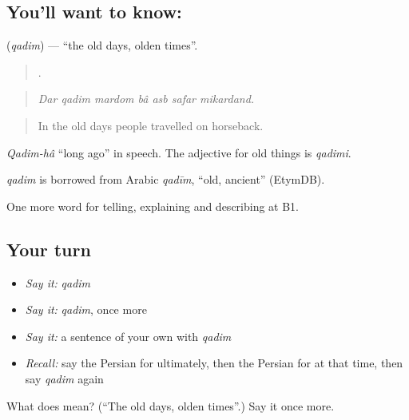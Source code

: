 \subsection*{You'll want to know: }
\textbf{} (\emph{qadim}) — \textquotedblleft{}the old days, olden times\textquotedblright{}.

\begin{quote}
      .
\end{quote}

\begin{quote}
\emph{Dar qadim mardom bâ asb safar mikardand.}
\end{quote}

\begin{quote}
In the old days people travelled on horseback.
\end{quote}

\emph{Qadim-hâ} \textquotedblleft{}long ago\textquotedblright{} in speech. The adjective for old things is \emph{qadimi}.

\begin{cousinweb}
\emph{qadim} is borrowed from Arabic \emph{qadīm}, \textquotedblleft{}old, ancient\textquotedblright{} (EtymDB).
\end{cousinweb}

\begin{grammarlens}[title={What you've built}]
One more word for telling, explaining and describing at B1.
\end{grammarlens}

\subsection*{Your turn}
\begin{itemize}
\raggedright
  \item \emph{Say it:} \emph{qadim}
  \item \emph{Say it:} \emph{qadim}, once more
  \item \emph{Say it:} a sentence of your own with \emph{qadim}
  \item \emph{Recall:} say the Persian for ultimately, then the Persian for at that time, then say \emph{qadim} again
\end{itemize}

\begin{tcolorbox}[breakable,colback=teal!4,colframe=teal!35!black,title={Before you move on}]
What does  mean? (\textquotedblleft{}The old days, olden times\textquotedblright{}.) Say it once more.
\end{tcolorbox}
